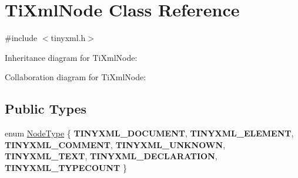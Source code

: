 \hypertarget{class_ti_xml_node}{
\section{\-Ti\-Xml\-Node \-Class \-Reference}
\label{class_ti_xml_node}
}


{\ttfamily \#include $<$tinyxml.\-h$>$}



\-Inheritance diagram for \-Ti\-Xml\-Node\-:


\-Collaboration diagram for \-Ti\-Xml\-Node\-:
\subsection*{\-Public \-Types}
\begin{DoxyCompactItemize}
\item 
enum \hyperlink{class_ti_xml_node_a836eded4920ab9e9ef28496f48cd95a2}{\-Node\-Type} \{ \*
{\bfseries \-T\-I\-N\-Y\-X\-M\-L\-\_\-\-D\-O\-C\-U\-M\-E\-N\-T}, 
{\bfseries \-T\-I\-N\-Y\-X\-M\-L\-\_\-\-E\-L\-E\-M\-E\-N\-T}, 
{\bfseries \-T\-I\-N\-Y\-X\-M\-L\-\_\-\-C\-O\-M\-M\-E\-N\-T}, 
{\bfseries \-T\-I\-N\-Y\-X\-M\-L\-\_\-\-U\-N\-K\-N\-O\-W\-N}, 
\*
{\bfseries \-T\-I\-N\-Y\-X\-M\-L\-\_\-\-T\-E\-X\-T}, 
{\bfseries \-T\-I\-N\-Y\-X\-M\-L\-\_\-\-D\-E\-C\-L\-A\-R\-A\-T\-I\-O\-N}, 
{\bfseries \-T\-I\-N\-Y\-X\-M\-L\-\_\-\-T\-Y\-P\-E\-C\-O\-U\-N\-T}
 \}
\end{DoxyCompactItemize}
